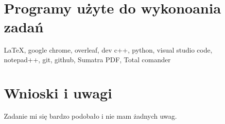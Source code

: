\documentclass[a4paper,11pt]{article}
\begin{document}
\section{Programy użyte do wykonoania zadań}  
\LaTeX, google chrome, overleaf, dev c++, python, visual studio code, notepad++, git, github, Sumatra PDF, Total comander  
\section{Wnioski i uwagi} 
\begin{center}
 \large{Zadanie mi się bardzo podobało i nie mam żadnych uwag.}   
\end{center}
 
\end{document}
